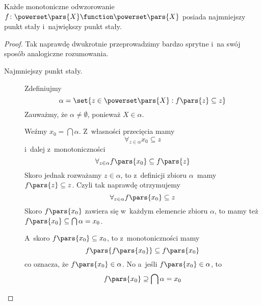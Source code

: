 \begin{theorem}
Każde monotoniczne odwzorowanie \(f\colon \powerset\pars{X} \function \powerset\pars{X}\) posiada najmniejszy punkt stały i~największy punkt stały.
\end{theorem}
\begin{proof}
    Tak naprawdę dwukrotnie przeprowadzimy bardzo sprytne i~na swój sposób analogiczne rozumowania.
    \begin{description}
        \item[Najmniejszy punkt stały.] Zdefiniujmy
            \begin{equation*}
                \alpha = \set{z \in \powerset\pars{X} : f\pars{z} \subseteq z}
            \end{equation*}
            Zauważmy, że \(\alpha \neq \emptyset\), ponieważ \(X \in \alpha\).
            
            Weźmy \(x_0 = \bigcap \alpha\). Z~własności przecięcia mamy
            \begin{equation*}
                \forall_{z \in \alpha} x_0 \subseteq z
            \end{equation*}
            i~dalej z~monotoniczności
            \begin{equation*}
                \forall_{z \in \alpha} f\pars{x_0} \subseteq f\pars{z}
            \end{equation*}
            Skoro jednak rozważamy \(z \in \alpha\), to z~definicji zbioru \(\alpha\)~mamy \(f\pars{z} \subseteq z\). Czyli tak naprawdę otrzymujemy
            \begin{equation*}
                \forall_{z \in \alpha} f\pars{x_0} \subseteq z
            \end{equation*}
            Skoro \(f\pars{x_0}\) zawiera się w~każdym elemencie zbioru \(\alpha\), to mamy też \(f\pars{x_0} \subseteq \bigcap \alpha = x_0\).
            
            A~skoro \(f\pars{x_0} \subseteq x_0\), to z~monotoniczności mamy
            \begin{equation*}
                f\pars{f\pars{x_0}} \subseteq f\pars{x_0}
            \end{equation*}
            co oznacza, że \(f\pars{x_0} \in \alpha\). No a~jeśli \(f\pars{x_0} \in \alpha\), to
            \begin{equation*}
                f\pars{x_0} \supseteq \bigcap \alpha = x_0
            \end{equation*}
            

\end{description}
\end{proof}

